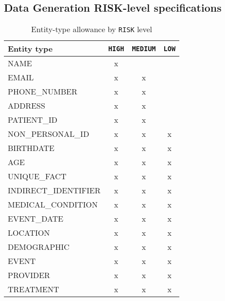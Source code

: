 \subsection*{Data Generation RISK-level specifications}\label{appendixB:risk-specifications}
\begin{table}[h]
\centering
\caption{Entity-type allowance by \texttt{RISK} level}
\label{appendixB:risk-specification-entity-matrix}
\renewcommand{\arraystretch}{1.1}
\begin{tabular}{|l|c|c|c|}
\hline
\textbf{Entity type} & \texttt{HIGH} & \texttt{MEDIUM} & \texttt{LOW} \\
\hline
NAME                 & x &   &   \\
EMAIL                & x & x &   \\
PHONE\_NUMBER        & x & x &   \\
ADDRESS              & x & x &   \\
PATIENT\_ID          & x & x &   \\
NON\_PERSONAL\_ID    & x & x & x \\
BIRTHDATE            & x & x & x \\
AGE                  & x & x & x \\
UNIQUE\_FACT         & x & x & x \\
INDIRECT\_IDENTIFIER & x & x & x \\
MEDICAL\_CONDITION   & x & x & x \\
EVENT\_DATE          & x & x & x \\
LOCATION             & x & x & x \\
DEMOGRAPHIC          & x & x & x \\
EVENT                & x & x & x \\
PROVIDER             & x & x & x \\
TREATMENT            & x & x & x \\
\hline
\end{tabular}
\end{table}
